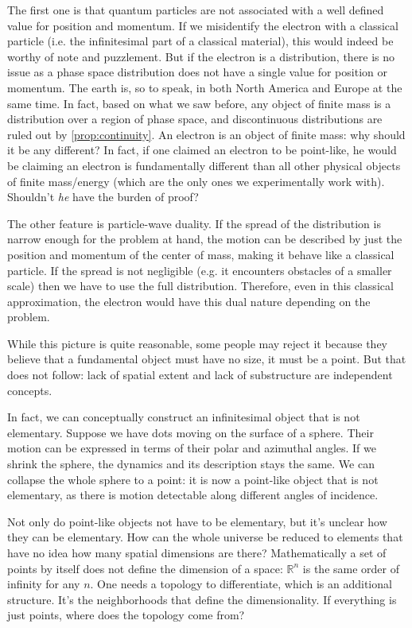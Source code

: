 \documentclass[smallextended]{svjour3}
\numberwithin{equation}{section}
\begin{document}
The first one is that quantum particles are not associated with a well defined value for position and momentum. If we misidentify the electron with a classical particle (i.e. the infinitesimal part of a classical material), this would indeed be worthy of note and puzzlement. But if the electron is a distribution, there is no issue as a phase space distribution does not have a single value for position or momentum. The earth is, so to speak, in both North America and Europe at the same time. In fact, based on what we saw before, any object of finite mass is a distribution over a region of phase space, and discontinuous distributions are ruled out by \ref{prop:continuity}. An electron is an object of finite mass: why should it be any different? In fact, if one claimed an electron to be point-like, he would be claiming an electron is fundamentally different than all other physical objects of finite mass/energy (which are the only ones we experimentally work with). Shouldn't \emph{he} have the burden of proof?

The other feature is particle-wave duality. If the spread of the distribution is narrow enough for the problem at hand, the motion can be described by just the position and momentum of the center of mass, making it behave like a classical particle. If the spread is not negligible (e.g. it encounters obstacles of a smaller scale) then we have to use the full distribution. Therefore, even in this classical approximation, the electron would have this dual nature depending on the problem.

While this picture is quite reasonable, some people may reject it because they believe that a fundamental object must have no size, it must be a point. But that does not follow: lack of spatial extent and lack of substructure are independent concepts.

In fact, we can conceptually construct an infinitesimal object that is not elementary. Suppose we have dots moving on the surface of a sphere. Their motion can be expressed in terms of their polar and azimuthal angles. If we shrink the sphere, the dynamics and its description stays the same. We can collapse the whole sphere to a point: it is now a point-like object that is not elementary, as there is motion detectable along different angles of incidence.

Not only do point-like objects not have to be elementary, but it's unclear how they can be elementary. How can the whole universe be reduced to  elements that have no idea how many spatial dimensions are there? Mathematically a set of points by itself does not define the dimension of a space: $\mathbb{R}^n$ is the same order of infinity for any $n$. One needs a topology to differentiate, which is an additional structure. It's the neighborhoods that define the dimensionality. If everything is just points, where does the topology come from? 
\end{document}
